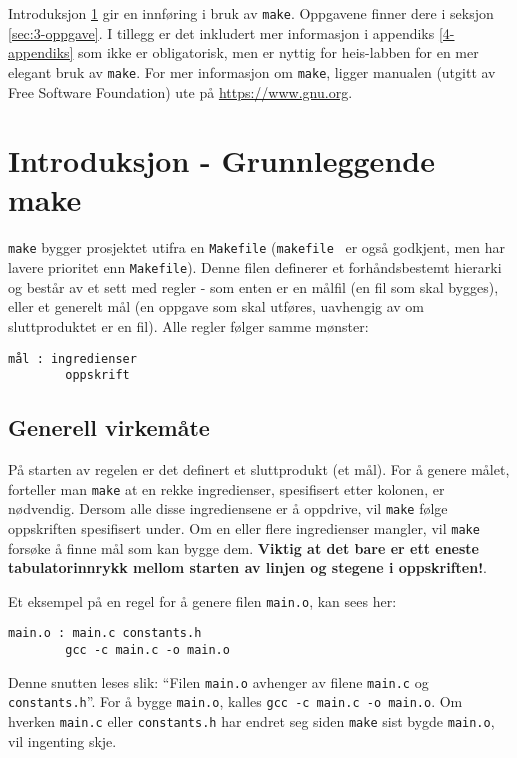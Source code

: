 \begin{alphasection}
 Introduksjon \ref{sec:2-innforing} gir en innføring i bruk av \verb|make|. Oppgavene finner dere i seksjon \ref{sec:3-oppgave}. I tillegg er det inkludert mer informasjon i appendiks \ref{4-appendiks} som ikke er obligatorisk, men er nyttig for heis-labben for en mer elegant bruk av \verb|make|. For mer informasjon om \verb|make|, ligger manualen (utgitt av Free Software Foundation) ute på \href{https://www.gnu.org/software/make/manual/make.html}{https://www.gnu.org}.
 

\section{Introduksjon - Grunnleggende make}\label{sec:2-innforing}

\verb|make| bygger prosjektet utifra en \verb|Makefile| (\verb|makefile| \ er også godkjent, men har lavere prioritet enn \verb|Makefile|). Denne filen definerer et forhåndsbestemt hierarki og består av et sett med regler - som enten er en målfil (en fil som skal bygges), eller et generelt mål (en oppgave som skal utføres, uavhengig av om sluttproduktet er en fil). Alle regler følger samme mønster:

\begin{lstlisting}
mål : ingredienser
        oppskrift
\end{lstlisting}

\subsection{Generell virkemåte}

På starten av regelen er det definert et sluttprodukt (et mål). For å genere målet, forteller man \verb|make| at en rekke ingredienser, spesifisert etter kolonen, er nødvendig. Dersom alle disse ingrediensene er å oppdrive, vil \verb|make| følge oppskriften spesifisert under. Om en eller flere ingredienser mangler, vil \verb|make| forsøke å finne mål som kan bygge dem. \textcolor{RWTHrot100}{\textbf{Viktig at det bare er ett eneste tabulatorinnrykk mellom starten av linjen og stegene i oppskriften!}}.

Et eksempel på en regel for å genere filen \verb|main.o|, kan sees her:

\begin{lstlisting}
main.o : main.c constants.h
        gcc -c main.c -o main.o
\end{lstlisting}

Denne snutten leses slik: ``Filen \verb|main.o| avhenger av filene \verb|main.c| og \verb|constants.h|''. For å bygge  \verb|main.o|, kalles \verb|gcc -c main.c -o main.o|. Om hverken \verb|main.c| eller \verb|constants.h| har endret seg siden \verb|make| sist bygde \verb|main.o|, vil ingenting skje.


\end{alphasection}
